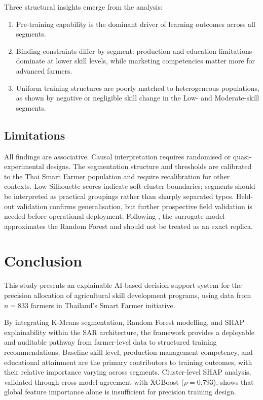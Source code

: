 \documentclass[3p,twocolumn,authoryear]{elsarticle}
\begin{document}
Three structural insights emerge from the analysis:
\begin{enumerate}
  \item Pre-training capability is the dominant driver of learning outcomes
  across all segments.
  \item Binding constraints differ by segment: production and education
  limitations dominate at lower skill levels, while marketing competencies matter
  more for advanced farmers.
  \item Uniform training structures are poorly matched to heterogeneous
  populations, as shown by negative or negligible skill change in the Low- and
  Moderate-skill segments.
\end{enumerate}

\subsection{Limitations}

All findings are associative. Causal interpretation requires randomised or
quasi-experimental designs. The segmentation structure and thresholds are
calibrated to the Thai Smart Farmer population and require recalibration for
other contexts. Low Silhouette scores indicate soft cluster boundaries; segments
should be interpreted as practical groupings rather than sharply separated
types. Held-out validation confirms generalisation, but further prospective
field validation is needed before operational deployment. Following
\citet{rudin2019}, the surrogate model approximates the Random Forest and should
not be treated as an exact replica.

\section{Conclusion}

This study presents an explainable AI-based decision support system for the
precision allocation of agricultural skill development programs, using data from
$n = 833$ farmers in Thailand's Smart Farmer initiative.

By integrating K-Means segmentation, Random Forest modelling, and SHAP
explainability within the SAR architecture, the framework provides a deployable
and auditable pathway from farmer-level data to structured training
recommendations. Baseline skill level, production management competency, and
educational attainment are the primary contributors to training outcomes, with
their relative importance varying across segments. Cluster-level SHAP analysis,
validated through cross-model agreement with XGBoost ($\rho = 0.793$), shows
that global feature importance alone is insufficient for precision training
design.
\end{document}
